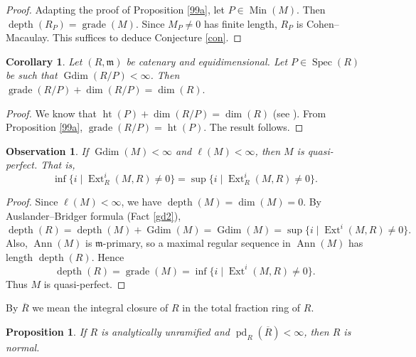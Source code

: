 \documentclass[11.05pt,a4paper]{amsart}
\newtheorem{proposition}[theorem]{Proposition}
\newtheorem{corollary}[theorem]{Corollary}
\newtheorem{observation}[theorem]{Observation}\newcommand{\up}[1]{{{}^{#1}\!}}
\theoremstyle{definition}
\theoremstyle{remark}
\newcommand{\grade}{\operatorname{grade}}
\newcommand{\Min}{\operatorname{Min}}
\newcommand{\Spec}{\operatorname{Spec}}
\newcommand{\pd}{\operatorname{pd}}
\newcommand{\Gdim}{\operatorname{Gdim}}
\newcommand{\Ext}{\operatorname{Ext}}
\newcommand{\Ann}{\operatorname{Ann}}
\newcommand{\depth}{\operatorname{depth}}
\begin{document}
\begin{proof}
	Adapting the proof of Proposition \ref{99a}, let $P \in \Min(M)$. Then $\depth(R_P) = \grade(M)$. Since $M_P \neq 0$ has finite length, $R_P$ is Cohen–Macaulay. This suffices to deduce Conjecture \ref{con}.
\end{proof}

\begin{corollary}
	Let $(R,\mathfrak{m})$ be catenary and equidimensional. Let $P \in \Spec(R)$ be such that $\Gdim(R/P) < \infty$. Then
	\(
	\grade(R/P) + \dim (R/P )= \dim (R).
	\)
\end{corollary}

\begin{proof}
	We know that $\operatorname{ht}(P) + \dim (R/P) = \dim( R)$ (see \cite[Page 250]{mat}). From Proposition \ref{99a}, $\grade(R/P) = \operatorname{ht}(P)$. The result follows.
\end{proof}

\begin{observation}
	If $\Gdim(M) < \infty$ and $\ell(M) < \infty$, then $M$ is quasi-perfect. That is,
	\[
	\inf\{ i \mid \Ext^i_R(M,R) \neq 0 \} 
	= 
	\sup\{ i \mid \Ext^i_R(M,R) \neq 0 \}.
	\]
\end{observation}

\begin{proof}
	Since $\ell(M) < \infty$, we have $\depth(M) = \dim(M)= 0$. By  Auslander–Bridger formula (Fact \ref{gd2}),
	\[
	\depth(R) = \depth(M)+\Gdim(M)= \Gdim(M)=\sup\{ i \mid \Ext^i(M,R) \neq 0 \}.
	\]
	Also, $\Ann(M)$ is $\mathfrak{m}$-primary, so a maximal regular sequence in $\Ann(M)$ has length $\depth(R)$. Hence
	\[
	\depth(R) = \grade(M) = \inf\{ i \mid \Ext^i(M,R) \neq 0 \}.
	\]
	Thus $M$ is quasi-perfect.
\end{proof}

By $\overline{R}$ we mean the integral closure of $R$ in the total fraction ring of $R$. 

\begin{proposition}\label{116}
	If $R$ is analytically unramified and $\pd_R(\overline{R}) < \infty$, then $R$ is normal.
\end{proposition}
\end{document}
